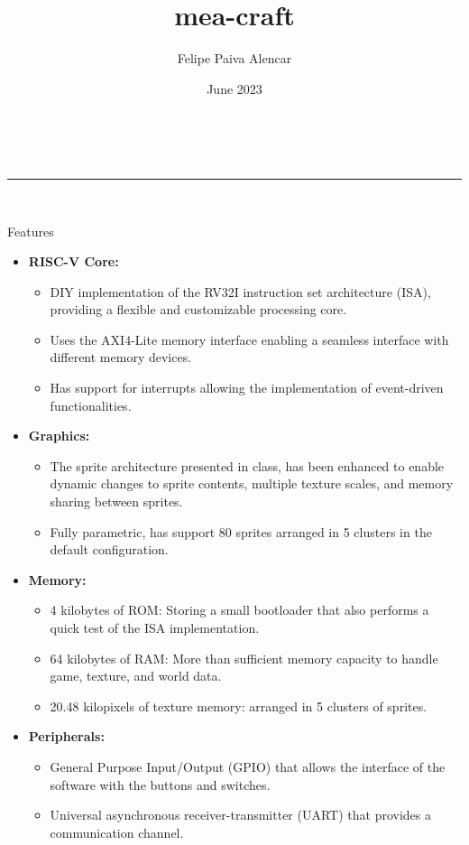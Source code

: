 \documentclass[10pt]{article}
\title{mea-craft}
\author{Felipe Paiva Alencar}
\date{June 2023}
\makeatletter
\renewcommand{\maketitle}{
{\Huge\textbf{\@title}} \\
\noindent\rule{\textwidth}{1pt} \\
\medskip
}
\renewcommand{\section}{%
  \@startsection{section}{1}{0pt}{-3.5ex plus -1ex minus -.2ex}{2.3ex plus .2ex}{\Large\bfseries\sffamily}%
}
\makeatother
\begin{document}
\maketitle

\begin{multicols}{2}
\section{Features}
\begin{itemize}

\item \textbf{RISC-V Core:}
\begin{itemize}
\item DIY implementation of the RV32I instruction set architecture (ISA),
providing a flexible and customizable processing core.
\item Uses the AXI4-Lite memory interface enabling a seamless interface with
different memory devices.
\item Has support for interrupts allowing the implementation of event-driven
functionalities.
\end{itemize}

\item \textbf{Graphics:}
\begin{itemize}
\item The sprite architecture presented in class, has been enhanced to enable
dynamic changes to sprite contents, multiple texture scales, and memory sharing
between sprites.
\item Fully parametric, has support 80 sprites arranged in 5 clusters in the
default configuration.
\end{itemize}

\item \textbf{Memory:} 
\begin{itemize}
\item 4 kilobytes of ROM: Storing a small bootloader that also performs a quick
test of the ISA implementation.
\item 64 kilobytes of RAM: More than sufficient memory capacity to
handle game, texture, and world data.
\item 20.48 kilopixels of texture memory: arranged in 5 clusters of sprites.
\end{itemize}

\item \textbf{Peripherals:}
\begin{itemize}
\item General Purpose Input/Output (GPIO) that allows the interface of the
software with the buttons and switches. 
\item Universal asynchronous receiver-transmitter (UART) that provides a
communication channel.
\end{itemize}


\end{itemize}
\end{multicols}
\end{document}
